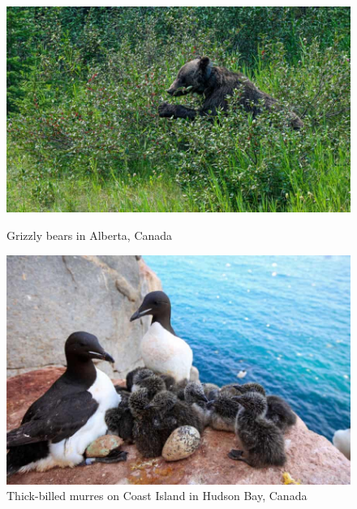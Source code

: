 \documentclass[12pt, a4paper]{article}
\begin{document}
\begin{figure}[h]
    \begin{minipage}{0.5\textwidth}
        \centering
        \includegraphics[width=0.9\linewidth]{bear.jpg}
        \caption{Grizzly bears in Alberta, Canada}
        \label{fig:bear}
    \end{minipage}
    \hfill
    \begin{minipage}{0.45\textwidth}
        \centering
        \includegraphics[width=0.9\linewidth]{seabirds.jpg}
        \caption{Thick-billed murres on Coast Island in Hudson Bay, Canada}
        \label{fig:cormorants}
    \end{minipage}
\end{figure}
\end{document}
